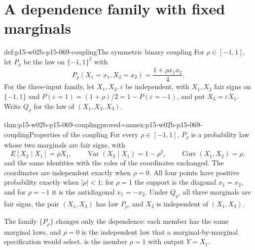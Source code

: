 \section{A dependence family with fixed marginals}

\begin{hbdefinition}{def:p15-w02b-p15-069-coupling}{The symmetric binary coupling}
For \(\rho\in[-1,1]\), let \(P_\rho\) be the law on \(\{-1,1\}^2\) with
\[
 P_\rho(X_1=x_1,X_2=x_2)=\frac{1+\rho x_1x_2}{4}.
\]
For the three-input family, let \(X_1,X_2,\varepsilon\) be independent,
with \(X_1,X_2\) fair signs on \(\{-1,1\}\) and
\(P(\varepsilon=1)=(1+\rho)/2=1-P(\varepsilon=-1)\), and put
\(X_3=\varepsilon X_1\). Write \(Q_\rho\) for the law of \((X_1,X_2,X_3)\).
\end{hbdefinition}

\begin{hblemma}{thm:p15-w02b-p15-069-coupling}{proved=annex:p15-w02b-p15-069-coupling}{Properties of the coupling}
For every \(\rho\in[-1,1]\), \(P_\rho\) is a probability law whose two
marginals are fair signs, with
\[
 E[X_2\mid X_1]=\rho X_1,\qquad
 \operatorname{Var}(X_2\mid X_1)=1-\rho^2,\qquad
 \operatorname{Corr}(X_1,X_2)=\rho,
\]
and the same identities with the roles of the coordinates exchanged.
The coordinates are independent exactly when \(\rho=0\). All four points
have positive probability exactly when \(|\rho|<1\); for \(\rho=1\) the
support is the diagonal \(x_1=x_2\), and for \(\rho=-1\) it is the
antidiagonal \(x_1=-x_2\).
Under \(Q_\rho\), all three marginals are fair signs, the pair
\((X_1,X_3)\) has law \(P_\rho\), and \(X_2\) is independent of
\((X_1,X_3)\).
\end{hblemma}

The family \(\{P_\rho\}\) changes only the dependence: each member has the
same marginal laws, and \(\rho=0\) is the independent law that a
marginal-by-marginal specification would select.
 is the member \(\rho=1\) with
output \(Y=X_1\).

